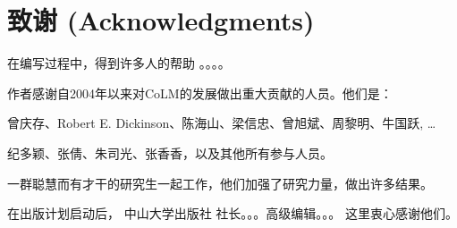 \chapter *{致谢 (Acknowledgments)}

在编写过程中，得到许多人的帮助 。。。。

作者感谢自2004年以来对CoLM的发展做出重大贡献的人员。他们是：

曾庆存、Robert E. Dickinson、陈海山、梁信忠、曾旭斌、周黎明、牛国跃, …

纪多颖、张倩、朱司光、张香香，以及其他所有参与人员。

一群聪慧而有才干的研究生一起工作，他们加强了研究力量，做出许多结果。

在出版计划启动后， 中山大学出版社 社长。。。高级编辑。。。 这里衷心感谢他们。
